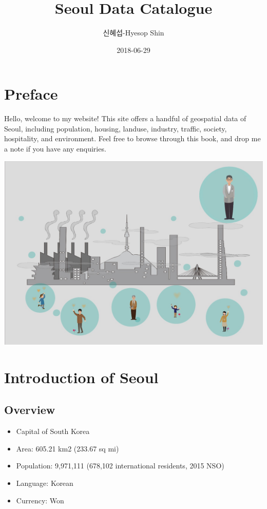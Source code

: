 \documentclass[]{book}
\title{Seoul Data Catalogue}
\author{신혜섭-Hyesop Shin}
\date{2018-06-29}
\providecommand{\tightlist}{%
  \setlength{\itemsep}{0pt}\setlength{\parskip}{0pt}}
\begin{document}
\maketitle

{
\setcounter{tocdepth}{1}
\tableofcontents
}
\chapter*{Preface}\label{preface}

Hello, welcome to my website! This site offers a handful of geospatial
data of Seoul, including population, housing, landuse, industry,
traffic, society, hospitality, and environment. Feel free to browse
through this book, and drop me a note if you have any enquiries.

\begin{center}\includegraphics[width=19.47in]{images/01_intro} \end{center}

\chapter{Introduction of Seoul}\label{introduction-of-seoul}

\section{Overview}\label{overview}

\begin{itemize}
\tightlist
\item
  Capital of South Korea
\item
  Area: 605.21 km2 (233.67 sq mi)
\item
  Population: 9,971,111 (678,102 international residents, 2015 NSO)
\item
  Language: Korean
\item
  Currency: Won
\end{itemize}
\end{document}
